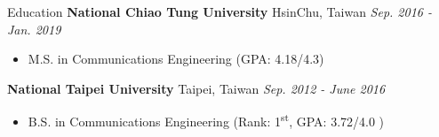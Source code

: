 \documentclass{resume} %
\newcommand{\ts}{\textsuperscript}
\begin{document}

\begin{rSection}{Education}
{\bf National Chiao Tung University} \hfill {HsinChu, Taiwan} \hfill {\em Sep. 2016 - Jan. 2019}
\begin{itemize} \item {M.S. in Communications Engineering (GPA: 4.18/4.3)} \end{itemize}
{\bf National Taipei University} \hfill {Taipei, Taiwan} \hfill {\em Sep. 2012 - June 2016}
\begin{itemize} \item {B.S. in Communications Engineering (Rank: 1\ts{st}, GPA: 3.72/4.0 )} \end{itemize}
\end{rSection}

\end{document}
